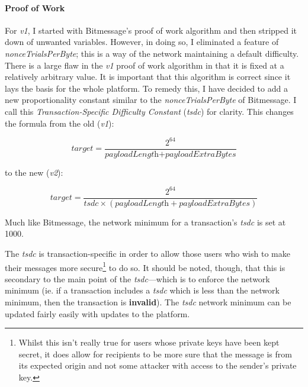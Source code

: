 \documentclass{article}
\begin{document}
\paragraph{Proof of Work}
For \textit{v1}, I started with Bitmessage's proof of work algorithm and then stripped it down of unwanted variables. However, in doing so, I eliminated a feature of \textit{nonceTrialsPerByte}; this is a way of the network maintaining a default difficulty. There is a large flaw in the \textit{v1} proof of work algorithm in that it is fixed at a relatively arbitrary value. It is important that this algorithm is correct since it lays the basis for the whole platform. To remedy this, I have decided to add a new proportionality constant similar to the \textit{nonceTrialsPerByte} of Bitmessage. I call this \textit{Transaction-Specific Difficulty Constant} (\textit{tsdc}) for clarity. This changes the formula from the old (\textit{v1}):
\vspace{-0.5cm}
\begin{center}
\[\textit{target} = \dfrac{2^{64}}{\textit{payloadLength} + \textit{payloadExtraBytes}}\]
\end{center}
to the new (\textit{v2}):
\vspace{-0.5cm}
\begin{center}
\[\textit{target} = \dfrac{2^{64}}{\textit{tsdc} \times \left(\textit{payloadLength} + \textit{payloadExtraBytes}\right)}\]
\end{center}

Much like Bitmessage, the network minimum for a transaction's \textit{tsdc} is set at 1000.

The \textit{tsdc} is transaction-specific in order to allow those users who wish to make their messages more secure\footnote{Whilst this isn't really true for users whose private keys have been kept secret, it does allow for recipients to be more sure that the message is from its expected origin and not some attacker with access to the sender's private key.} to do so. It should be noted, though, that this is secondary to the main point of the \textit{tsdc}---which is to enforce the network minimum (ie. if a transaction includes a \textit{tsdc} which is less than the network minimum, then the transaction is \textbf{invalid}). The \textit{tsdc} network minimum can be updated fairly easily with updates to the platform.
\end{document}
